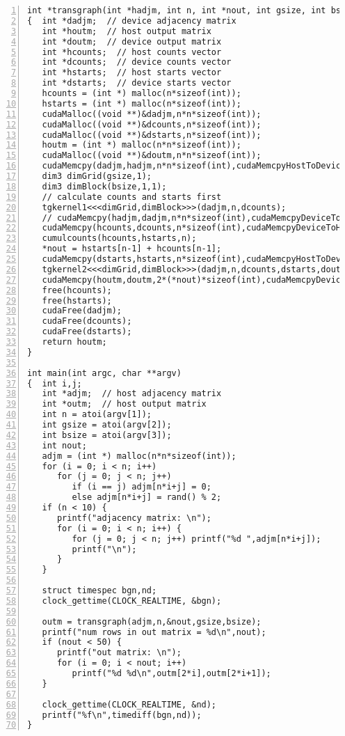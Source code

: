 \begin{lstlisting}[numbers=left]
int *transgraph(int *hadjm, int n, int *nout, int gsize, int bsize)
{  int *dadjm;  // device adjacency matrix
   int *houtm;  // host output matrix
   int *doutm;  // device output matrix
   int *hcounts;  // host counts vector
   int *dcounts;  // device counts vector
   int *hstarts;  // host starts vector
   int *dstarts;  // device starts vector
   hcounts = (int *) malloc(n*sizeof(int));
   hstarts = (int *) malloc(n*sizeof(int));
   cudaMalloc((void **)&dadjm,n*n*sizeof(int));
   cudaMalloc((void **)&dcounts,n*sizeof(int));
   cudaMalloc((void **)&dstarts,n*sizeof(int));
   houtm = (int *) malloc(n*n*sizeof(int));
   cudaMalloc((void **)&doutm,n*n*sizeof(int));
   cudaMemcpy(dadjm,hadjm,n*n*sizeof(int),cudaMemcpyHostToDevice);
   dim3 dimGrid(gsize,1);
   dim3 dimBlock(bsize,1,1);
   // calculate counts and starts first
   tgkernel1<<<dimGrid,dimBlock>>>(dadjm,n,dcounts);
   // cudaMemcpy(hadjm,dadjm,n*n*sizeof(int),cudaMemcpyDeviceToHost);
   cudaMemcpy(hcounts,dcounts,n*sizeof(int),cudaMemcpyDeviceToHost);
   cumulcounts(hcounts,hstarts,n);
   *nout = hstarts[n-1] + hcounts[n-1];
   cudaMemcpy(dstarts,hstarts,n*sizeof(int),cudaMemcpyHostToDevice);
   tgkernel2<<<dimGrid,dimBlock>>>(dadjm,n,dcounts,dstarts,doutm);
   cudaMemcpy(houtm,doutm,2*(*nout)*sizeof(int),cudaMemcpyDeviceToHost);
   free(hcounts);
   free(hstarts);
   cudaFree(dadjm);
   cudaFree(dcounts);
   cudaFree(dstarts);
   return houtm;
}

int main(int argc, char **argv)
{  int i,j;
   int *adjm;  // host adjacency matrix 
   int *outm;  // host output matrix
   int n = atoi(argv[1]);
   int gsize = atoi(argv[2]);
   int bsize = atoi(argv[3]);
   int nout;
   adjm = (int *) malloc(n*n*sizeof(int));
   for (i = 0; i < n; i++)
      for (j = 0; j < n; j++)
         if (i == j) adjm[n*i+j] = 0;
         else adjm[n*i+j] = rand() % 2;
   if (n < 10) {
      printf("adjacency matrix: \n");
      for (i = 0; i < n; i++) {
         for (j = 0; j < n; j++) printf("%d ",adjm[n*i+j]);
         printf("\n");
      }
   }
   
   struct timespec bgn,nd;
   clock_gettime(CLOCK_REALTIME, &bgn);

   outm = transgraph(adjm,n,&nout,gsize,bsize);
   printf("num rows in out matrix = %d\n",nout);
   if (nout < 50) {
      printf("out matrix: \n");
      for (i = 0; i < nout; i++) 
         printf("%d %d\n",outm[2*i],outm[2*i+1]);
   }

   clock_gettime(CLOCK_REALTIME, &nd);
   printf("%f\n",timediff(bgn,nd));
}

\end{lstlisting}

